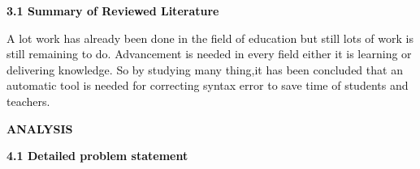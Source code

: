 \documentclass[12pt]{report}
\renewcommand{\_}{\kern-1.5pt\textunderscore\kern-1.5pt}
\begin{document}
\vspace{\baselineskip}\begin{adjustwidth}{0.2in}{0.84in}
\begin{justify}
{\fontsize{13pt}{15.6pt}\selectfont \textbf{\textcolor[HTML]{0D0D0D}{3.1 Summary of Reviewed Literature}}\par}
\end{justify}\par

\end{adjustwidth}


\vspace{\baselineskip}
\begin{adjustwidth}{0.2in}{0.84in}
\textcolor[HTML]{0D0D0D}{A lot work has already been done in the field of education but still lots of work is still remaining to do. Advancement is needed in every field either it is learning or delivering knowledge. So by studying many thing,it has been concluded that an automatic tool is needed for correcting syntax error to save time of students and teachers.}\par

\end{adjustwidth}


\vspace{\baselineskip}
\vspace{\baselineskip}

\vspace{\baselineskip}
\begin{adjustwidth}{4.67in}{0.0in}
{\fontsize{24pt}{28.8pt}\selectfont \textbf{\textcolor[HTML]{0D0D0D}{ANALYSIS}}\par}\par

\end{adjustwidth}


\vspace{\baselineskip}

\vspace{\baselineskip}
\vspace{\baselineskip}

\vspace{\baselineskip}
\begin{adjustwidth}{0.2in}{0.84in}
\begin{justify}
{\fontsize{16pt}{19.2pt}\selectfont \textbf{\textcolor[HTML]{0D0D0D}{4.1 Detailed problem statement}}\par}
\end{justify}\par

\end{adjustwidth}
\end{document}
